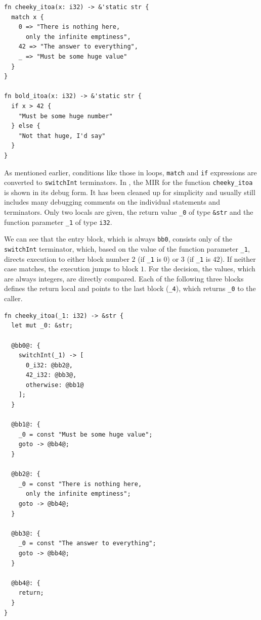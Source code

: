 \documentclass[paper=a4,%
  twoside,%
  BCOR4mm,%
  abstract=true,%
  toc=bibliography,%
  chapterprefix=true,%
  toc=bibliographynumbered,%
  open=right,%
  english,%
  pagesize=pdftex]{scrreprt}
\newcommand{\mir}{\ac{MIR}\xspace}
\begin{document}
\begin{lstlisting}[style=boxed, caption={HIR of the code in \Cref{lst:hir-lowering}}, label=lst:mir-lowering]
fn cheeky_itoa(x: i32) -> &'static str {
  match x {
    0 => "There is nothing here, 
      only the infinite emptiness",
    42 => "The answer to everything",
    _ => "Must be some huge value"
  }
}

fn bold_itoa(x: i32) -> &'static str {
  if x > 42 {
    "Must be some huge number"
  } else {
    "Not that huge, I'd say"
  }
}
\end{lstlisting}

As mentioned earlier, conditions like those in loops, \texttt{match} and \texttt{if} expressions are converted to \texttt{switchInt} terminators. In , the \mir for the function \texttt{cheeky\string_itoa} is shown in its debug form. It has been cleaned up for simplicity and usually still includes many debugging comments on the individual statements and terminators. Only two locals are given, the return value \texttt{\string_0} of type \texttt{\string&str} 
and the function parameter \texttt{\string_1} of type \texttt{i32}.

We can see that the entry block, which is always \texttt{bb0}, consists only of the \texttt{switchInt} terminator, which, based on the value of the function parameter \texttt{\string_1}, directs execution to either block number $2$ (if \texttt{\string_1} is $0$) or $3$ (if \texttt{\string_1} is $42$). If neither case matches, the execution jumps to block $1$. For the decision, the values, which are always integers, are directly compared. Each of the following three blocks defines the return local and points to the last block (\texttt{\string_4}), which returns \texttt{\string_0} to the caller. 

\begin{lstlisting}[language={MIR}, style=boxed, caption={\mir of the \texttt{cheeky\string_itoa} function}, label=lst:mir-lowered-first]
fn cheeky_itoa(_1: i32) -> &str {
  let mut _0: &str;

  @bb0@: {
    switchInt(_1) -> [
      0_i32: @bb2@, 
      42_i32: @bb3@, 
      otherwise: @bb1@
    ]; 
  }

  @bb1@: {
    _0 = const "Must be some huge value"; 
    goto -> @bb4@;                  
  }

  @bb2@: {
    _0 = const "There is nothing here, 
      only the infinite emptiness"; 
    goto -> @bb4@;                   
  }

  @bb3@: {
    _0 = const "The answer to everything";
    goto -> @bb4@; 
  }

  @bb4@: {
    return;
  }
}
\end{lstlisting}
\end{document}
